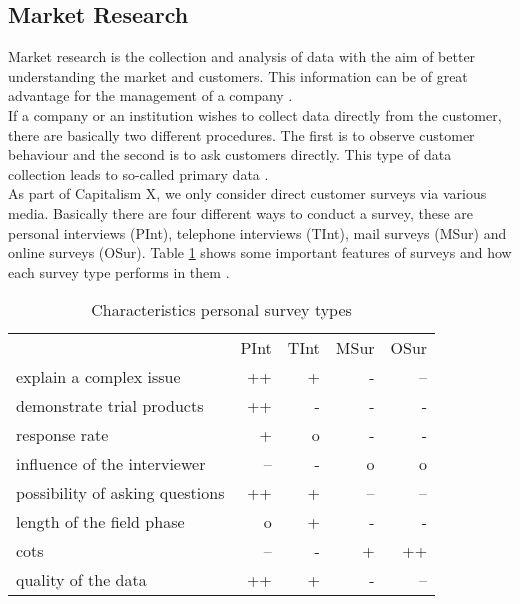 \subsection{Market Research} \label{market_research_simulation}


Market research is the collection and analysis of data with the aim of better understanding the market and customers. This information can be of great advantage for the management of a company \cite[Chapter~1.2]{mooi_introduction_2018}.\\

If a company or an institution wishes to collect data directly from the customer, there are basically two different procedures. The first is to observe customer behaviour and the second is to ask customers directly. This type of data collection leads to so-called primary data \cite[Chapter~4.4]{mooi_getting_2018}.\\

As part of Capitalism X, we only consider direct customer surveys via various media. Basically there are four different ways to conduct a survey, these are personal interviews (\gls{PInt}), telephone interviews (\gls{TInt}), mail surveys (\gls{MSur}) and online surveys (\gls{OSur}). Table \ref{MR_survey_types_characteristics} shows some important features of surveys and how each survey type performs in them \cite[Chapter~4.4.2.2]{mooi_getting_2018}.\\

\begin{table}[ht]
\centering
\begin{tabular}{|l|r|r|r|r|}
\hline
                                & PInt    & TInt    & MSur   & OSur \\
explain a complex issue         & ++    & +     & -    & --  \\
demonstrate trial products      & ++    & -     & -    & -   \\
response rate                   & +     & o     & -    & -   \\
influence of the interviewer    & --    & -     & o    & o   \\
possibility of asking questions & ++    & +     & --   & --  \\
length of the field phase       & o     & +     & -    & -   \\
cots                            & --    & -     & +    & ++  \\
quality of the data             & ++    & +     & -    & --  \\
\hline
\end{tabular}
\caption{Characteristics personal survey types}
\label{MR_survey_types_characteristics}
\end{table}

